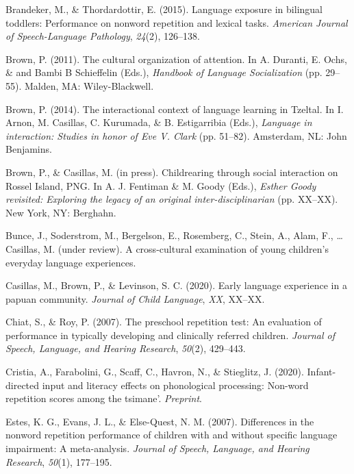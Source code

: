 \documentclass[english,,man,floatsintext]{apa6}
\begin{document}
\hypertarget{ref-brandeker2015language}{}
Brandeker, M., \& Thordardottir, E. (2015). Language exposure in
bilingual toddlers: Performance on nonword repetition and lexical tasks.
\emph{American Journal of Speech-Language Pathology}, \emph{24}(2),
126--138.

\hypertarget{ref-brown2011cultural}{}
Brown, P. (2011). The cultural organization of attention. In A. Duranti,
E. Ochs, \& and Bambi B Schieffelin (Eds.), \emph{Handbook of Language
Socialization} (pp. 29--55). Malden, MA: Wiley-Blackwell.

\hypertarget{ref-brown2014interactional}{}
Brown, P. (2014). The interactional context of language learning in
Tzeltal. In I. Arnon, M. Casillas, C. Kurumada, \& B. Estigarribia
(Eds.), \emph{Language in interaction: Studies in honor of Eve V. Clark}
(pp. 51--82). Amsterdam, NL: John Benjamins.

\hypertarget{ref-brownIPchildrearing}{}
Brown, P., \& Casillas, M. (in press). Childrearing through social
interaction on Rossel Island, PNG. In A. J. Fentiman \& M. Goody (Eds.),
\emph{Esther Goody revisited: Exploring the legacy of an original
inter-disciplinarian} (pp. XX--XX). New York, NY: Berghahn.

\hypertarget{ref-bunceURcrosscultural}{}
Bunce, J., Soderstrom, M., Bergelson, E., Rosemberg, C., Stein, A.,
Alam, F., \ldots{} Casillas, M. (under review). A cross-cultural
examination of young children's everyday language experiences.

\hypertarget{ref-casillas2020early}{}
Casillas, M., Brown, P., \& Levinson, S. C. (2020). Early language
experience in a papuan community. \emph{Journal of Child Language},
\emph{XX}, XX--XX.

\hypertarget{ref-chiat2007preschool}{}
Chiat, S., \& Roy, P. (2007). The preschool repetition test: An
evaluation of performance in typically developing and clinically
referred children. \emph{Journal of Speech, Language, and Hearing
Research}, \emph{50}(2), 429--443.

\hypertarget{ref-cristia2020infant}{}
Cristia, A., Farabolini, G., Scaff, C., Havron, N., \& Stieglitz, J.
(2020). Infant-directed input and literacy effects on phonological
processing: Non-word repetition scores among the tsimane'.
\emph{Preprint}.

\hypertarget{ref-estes2007differences}{}
Estes, K. G., Evans, J. L., \& Else-Quest, N. M. (2007). Differences in
the nonword repetition performance of children with and without specific
language impairment: A meta-analysis. \emph{Journal of Speech, Language,
and Hearing Research}, \emph{50}(1), 177--195.
\end{document}

